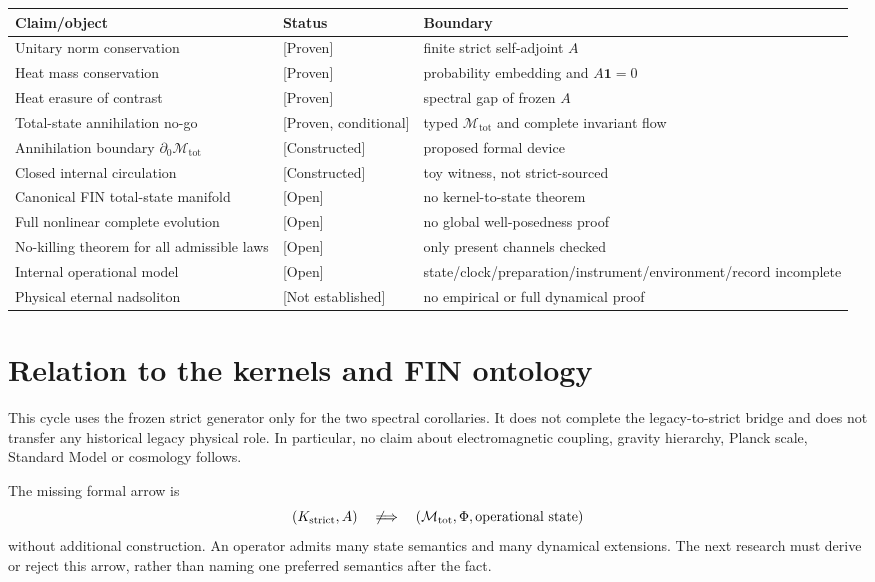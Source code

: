 \documentclass[11pt,a4paper]{article}
\newcommand{\Mtot}{\mathcal M_{\mathrm{tot}}}
\newcommand{\status}[1]{\textsf{[#1]}}
\begin{document}
\begin{longtable}{@{}p{}p{}p{}@{}}
\toprule
Claim/object & Status & Boundary \\
\midrule\endhead
Unitary norm conservation & \status{Proven} & finite strict self-adjoint $A$ \\
Heat mass conservation & \status{Proven} & probability embedding and $A\mathbf1=0$ \\
Heat erasure of contrast & \status{Proven} & spectral gap of frozen $A$ \\
Total-state annihilation no-go & \status{Proven, conditional} & typed $\Mtot$ and complete invariant flow \\
Annihilation boundary $\partial_0\Mtot$ & \status{Constructed} & proposed formal device \\
Closed internal circulation & \status{Constructed} & toy witness, not strict-sourced \\
Canonical FIN total-state manifold & \status{Open} & no kernel-to-state theorem \\
Full nonlinear complete evolution & \status{Open} & no global well-posedness proof \\
No-killing theorem for all admissible laws & \status{Open} & only present channels checked \\
Internal operational model & \status{Open} & state/clock/preparation/instrument/environment/record incomplete \\
Physical eternal nadsoliton & \status{Not established} & no empirical or full dynamical proof \\
\bottomrule
\end{longtable}

\section{Relation to the kernels and FIN ontology}

This cycle uses the frozen strict generator only for the two spectral
corollaries.  It does not complete the legacy-to-strict bridge and does not
transfer any historical legacy physical role.  In particular, no claim about
electromagnetic coupling, gravity hierarchy, Planck scale, Standard Model or
cosmology follows.

The missing formal arrow is
\[
 (K_{\rm strict},A)
 \quad\not\Longrightarrow\quad
 (\Mtot,\Phi,\text{operational state})
\]
without additional construction.  An operator admits many state semantics and
many dynamical extensions.  The next research must derive or reject this
arrow, rather than naming one preferred semantics after the fact.
\end{document}
